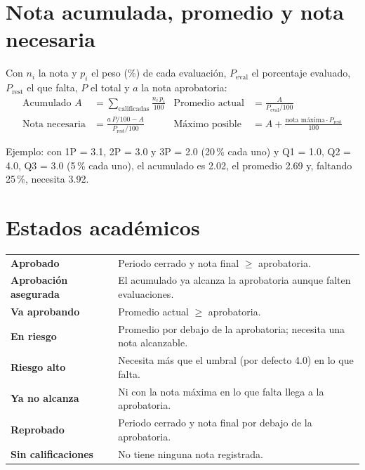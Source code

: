 \documentclass[11pt,letterpaper,oneside]{report}
\begin{document}
\section{Nota acumulada, promedio y nota necesaria}\label{sec:formulas}
Con $n_i$ la nota y $p_i$ el peso (\%) de cada evaluación, $P_{\text{eval}}$ el porcentaje evaluado, $P_{\text{rest}}$ el que falta, $P$ el total y $a$ la nota aprobatoria:
\begin{align*}
\text{Acumulado } A &= \sum_{\text{calificadas}} \frac{n_i\,p_i}{100} &
\text{Promedio actual} &= \frac{A}{P_{\text{eval}}/100}\\[4pt]
\text{Nota necesaria} &= \frac{a\,P/100 - A}{P_{\text{rest}}/100} &
\text{Máximo posible} &= A + \frac{\text{nota máxima}\cdot P_{\text{rest}}}{100}
\end{align*}
\begin{nota}
Ejemplo: con 1P = 3.1, 2P = 3.0 y 3P = 2.0 (20\,\% cada uno) y Q1 = 1.0, Q2 = 4.0, Q3 = 3.0 (5\,\% cada uno), el acumulado es 2.02, el promedio 2.69 y, faltando 25\,\%, necesita 3.92.
\end{nota}

\section{Estados académicos}\label{sec:estados}
\begin{tabularx}{\linewidth}{>{\bfseries}l X}
\toprule
\textcolor{verde}{Aprobado} & Periodo cerrado y nota final $\geq$ aprobatoria.\\
\textcolor{verde}{Aprobación asegurada} & El acumulado ya alcanza la aprobatoria aunque falten evaluaciones.\\
\textcolor{azul}{Va aprobando} & Promedio actual $\geq$ aprobatoria.\\
\textcolor{ambar}{En riesgo} & Promedio por debajo de la aprobatoria; necesita una nota alcanzable.\\
\textcolor{ambar}{Riesgo alto} & Necesita más que el umbral (por defecto 4.0) en lo que falta.\\
\textcolor{rojo}{Ya no alcanza} & Ni con la nota máxima en lo que falta llega a la aprobatoria.\\
\textcolor{rojo}{Reprobado} & Periodo cerrado y nota final por debajo de la aprobatoria.\\
\textcolor{gris}{Sin calificaciones} & No tiene ninguna nota registrada.\\
\bottomrule
\end{tabularx}
\end{document}
